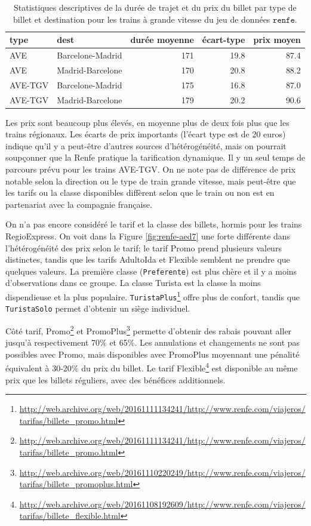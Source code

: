 \documentclass[
  11pt,
  letterpaper,
]{article}
\renewcommand{\href}[2]{#2\footnote{\url{#1}}}
\theoremstyle{definition}
\theoremstyle{definition}
\theoremstyle{definition}
\theoremstyle{definition}
\theoremstyle{remark}
\begin{document}
\begin{table}

\caption{\label{tab:renfe-aed5}Statistiques descriptives de la durée de trajet et du prix du billet par type de billet et destination pour les trains à grande vitesse du jeu de données $\texttt{renfe}$.}
\centering
\begin{tabular}[t]{llrrr}
\toprule
type & dest & durée moyenne & écart-type & prix moyen\\
\midrule
AVE & Barcelone-Madrid & 171 & 19.8 & 87.4\\
AVE & Madrid-Barcelone & 170 & 20.8 & 88.2\\
AVE-TGV & Barcelone-Madrid & 175 & 16.8 & 87.0\\
AVE-TGV & Madrid-Barcelone & 179 & 20.2 & 90.6\\
\bottomrule
\end{tabular}
\end{table}

Les prix sont beaucoup plus élevés, en moyenne plus de deux fois plus que les trains régionaux. Les écarts de prix importants (l'écart type est de 20 euros) indique qu'il y a peut-être d'autres sources d'hétérogénéité, mais on pourrait soupçonner que la Renfe pratique la tarification dynamique. Il y un seul temps de parcours prévu pour les trains AVE-TGV. On ne note pas de différence de prix notable selon la direction ou le type de train grande vitesse, mais peut-être que les tarifs ou la classe disponibles diffèrent selon que le train ou non est en partenariat avec la compagnie française.

On n'a pas encore considéré le tarif et la classe des billets, hormis pour les trains RegioExpress. On voit dans la Figure \ref{fig:renfe-aed7} une forte différente dans l'hétérogénéité des prix selon le tarif; le tarif Promo prend plusieurs valeurs distinctes, tandis que les tarifs AdultoIda et Flexible semblent ne prendre que quelques valeurs. La première classe (\texttt{Preferente}) est plus chère et il y a moins d'observations dans ce groupe. La classe Turista est la classe la moins dispendieuse et la plus populaire. \href{http://web.archive.org/web/20161111134241/http://www.renfe.com/viajeros/tarifas/billete_promo.html}{\texttt{TuristaPlus}} offre plus de confort, tandis que \texttt{TuristaSolo} permet d'obtenir un siège individuel.

Côté tarif, \href{http://web.archive.org/web/20161111134241/http://www.renfe.com/viajeros/tarifas/billete_promo.html}{Promo} et \href{http://web.archive.org/web/20161110220249/http://www.renfe.com/viajeros/tarifas/billete_promoplus.html}{PromoPlus} permette d'obtenir des rabais pouvant aller jusqu'à respectivement 70\% et 65\%. Les annulations et changements ne sont pas possibles avec Promo, mais disponibles avec PromoPlus moyennant une pénalité équivalent à 30-20\% du prix du billet. Le tarif \href{http://web.archive.org/web/20161108192609/http://www.renfe.com/viajeros/tarifas/billete_flexible.html}{Flexible} est disponible au même prix que les billets réguliers, avec des bénéfices additionnels.
\end{document}
